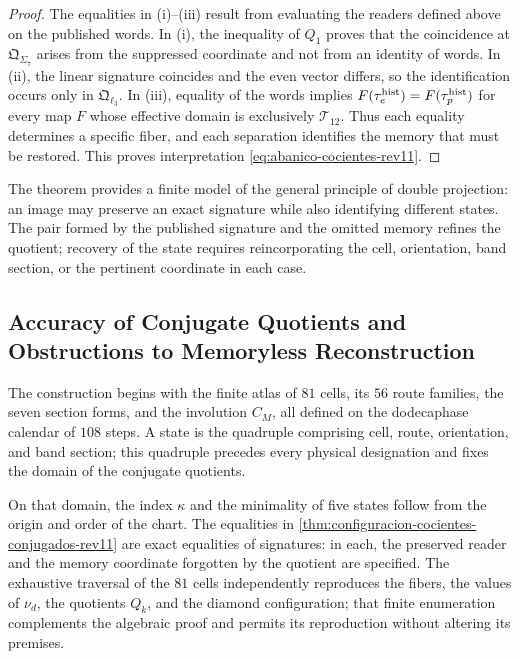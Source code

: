 \begin{proof}
The equalities in (i)--(iii) result from evaluating the readers defined above on the published words. In (i), the inequality of \(Q_1\) proves that the coincidence at \(\mathfrak Q_{\Sigma_7}\) arises from the suppressed coordinate and not from an identity of words. In (ii), the linear signature coincides and the even vector differs, so the identification occurs only in \(\mathfrak Q_{\ell_3}\). In (iii), equality of the words implies \(F(\tau_e^{\rm hist})=F(\tau_p^{\rm hist})\) for every map \(F\) whose effective domain is exclusively \(\mathcal T_{12}\). Thus each equality determines a specific fiber, and each separation identifies the memory that must be restored. This proves interpretation \eqref{eq:abanico-cocientes-rev11}.
\end{proof}

The theorem provides a finite model of the general principle of double
projection: an image may preserve an exact signature while also
identifying different states. The pair formed by the published signature and
the omitted memory refines the quotient; recovery of the state requires
reincorporating the cell, orientation, band section, or the pertinent coordinate
in each case.

\subsection{Accuracy of Conjugate Quotients and Obstructions to Memoryless Reconstruction}

The construction begins with the finite atlas of \(81\) cells, its \(56\)
route families, the seven section forms, and the involution \(C_M\), all
defined on the dodecaphase calendar of \(108\) steps. A state
is the quadruple comprising cell, route, orientation, and band section; this
quadruple precedes every physical designation and fixes the domain of the
conjugate quotients.

On that domain, the index \(\kappa\) and the minimality of five states follow from the origin and order of the chart. The equalities in \cref{thm:configuracion-cocientes-conjugados-rev11} are exact equalities of signatures: in each, the preserved reader and the memory coordinate forgotten by the quotient are specified. The exhaustive traversal of the \(81\) cells independently reproduces the fibers, the values of \(\nu_d\), the quotients \(Q_k\), and the diamond configuration; that finite enumeration complements the algebraic proof and permits its reproduction without altering its premises.

